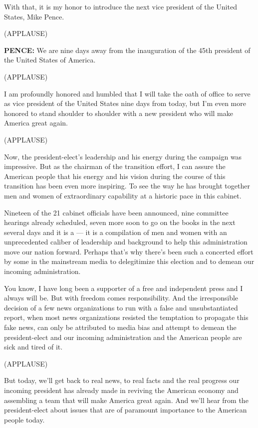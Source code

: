With that, it is my honor to introduce the next vice president of the
United States, Mike Pence.

(APPLAUSE)

\textbf{PENCE:} We are nine days away from the inauguration of the 45th
president of the United States of America.

(APPLAUSE)

I am profoundly honored and humbled that I will take the oath of office
to serve as vice president of the United States nine days from today,
but I'm even more honored to stand shoulder to shoulder with a new
president who will make America great again.

(APPLAUSE)

Now, the president-elect's leadership and his energy during the campaign
was impressive. But as the chairman of the transition effort, I can
assure the American people that his energy and his vision during the
course of this transition has been even more inspiring. To see the way
he has brought together men and women of extraordinary capability at a
historic pace in this cabinet.

Nineteen of the 21 cabinet officials have been announced, nine committee
hearings already scheduled, seven more soon to go on the books in the
next several days and it is a --- it is a compilation of men and women
with an unprecedented caliber of leadership and background to help this
administration move our nation forward. Perhaps that's why there's been
such a concerted effort by some in the mainstream media to delegitimize
this election and to demean our incoming administration.

You know, I have long been a supporter of a free and independent press
and I always will be. But with freedom comes responsibility. And the
irresponsible decision of a few news organizations to run with a false
and unsubstantiated report, when most news organizations resisted the
temptation to propagate this fake news, can only be attributed to media
bias and attempt to demean the president-elect and our incoming
administration and the American people are sick and tired of it.

(APPLAUSE)

But today, we'll get back to real news, to real facts and the real
progress our incoming president has already made in reviving the
American economy and assembling a team that will make America great
again. And we'll hear from the president-elect about issues that are of
paramount importance to the American people today.

